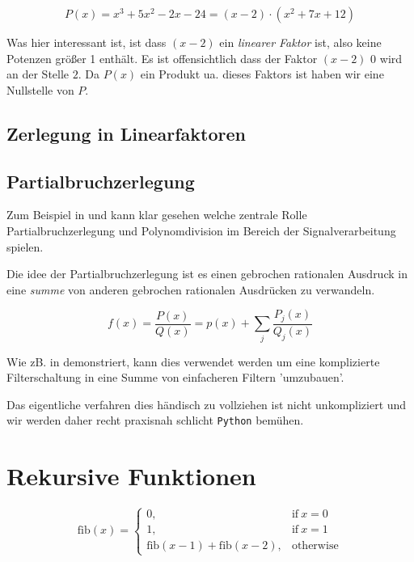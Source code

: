$$P(x) = x^{3} + 5 x^{2} - 2 x - 24 = (x-2) \cdot (x^2 + 7x + 12)$$


Was hier interessant ist, ist dass $(x-2)$ ein \emph{linearer Faktor} ist, also keine Potenzen größer 1 enthält. Es ist offensichtlich dass der Faktor $(x-2)$ $0$ wird an der Stelle $2$. Da $P(x)$ ein Produkt ua. dieses Faktors ist haben wir eine Nullstelle von $P$.


\subsection{Zerlegung in Linearfaktoren}\label{sec:linearfaktoren}




\subsection{Partialbruchzerlegung}
Zum Beispiel in \cite{liski2019converting} und \cite{freeman2011} kann klar gesehen welche zentrale Rolle Partialbruchzerlegung und Polynomdivision im Bereich der Signalverarbeitung spielen.

Die idee der Partialbruchzerlegung ist es einen gebrochen rationalen Ausdruck in eine \emph{summe} von anderen gebrochen rationalen Ausdrücken zu verwandeln. 

\begin{equation}
{\displaystyle {f(x) = \frac {P(x)}{Q(x)}}=p(x)+\sum _{j}{\frac {P_{j}(x)}{Q_{j}(x)}}}
\end{equation}

Wie zB. in \citep{freeman2011} demonstriert, kann dies verwendet werden um eine komplizierte Filterschaltung in eine Summe von einfacheren Filtern 'umzubauen'.

Das eigentliche verfahren dies händisch zu vollziehen ist nicht unkompliziert und wir werden daher recht praxisnah schlicht \texttt{Python} bemühen.

\section{Rekursive Funktionen}
\begin{equation}
	 \displaystyle \mathrm{fib}(x) = \left\{ \begin{array}{ll} 0, & \mathrm{if} \ x = 0 \\ 1, & \mathrm{if} \ x = 1 \\ \mathrm{fib} \mathopen{}\left( x - 1 \mathclose{}\right) + \mathrm{fib} \mathopen{}\left( x - 2 \mathclose{}\right), & \mathrm{otherwise} \end{array} \right. \label{eq:fib}
\end{equation}

